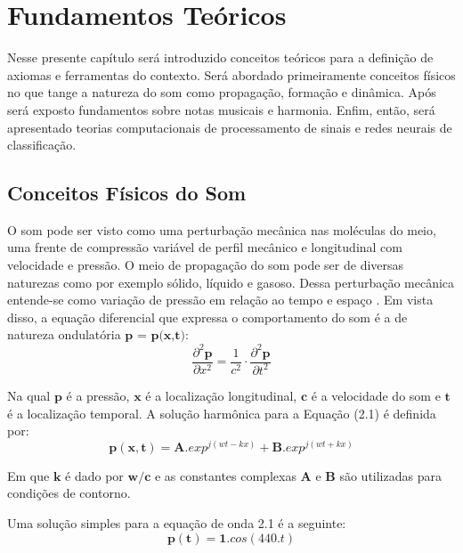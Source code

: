 \chapter{Fundamentos Teóricos}
\label{chap:fundamentosteoricos}

Nesse presente capítulo será introduzido conceitos teóricos para a definição de axiomas e ferramentas do contexto. Será abordado primeiramente conceitos físicos no que tange a natureza do som como propagação, formação e dinâmica. Após será exposto fundamentos sobre notas musicais e harmonia. Enfim, então, será apresentado teorias computacionais de processamento de sinais e redes neurais de classificação.

\section{Conceitos Físicos do Som}
\label{sec:conceitosfiscossom}

O som pode ser visto como uma perturbação mecânica nas moléculas do meio, uma frente de compressão variável  de perfil mecânico e longitudinal com velocidade e pressão. O meio de propagação do som pode ser de diversas naturezas como por exemplo sólido, líquido e gasoso. Dessa perturbação mecânica entende-se como variação de pressão em relação ao tempo e espaço \cite{portela2008caracterizaccao}. Em vista disso, a equação diferencial que expressa o comportamento do som é a de natureza ondulatória $\textbf{p = p(x,t)}$:
\begin{equation}
\label{eqn01}
	\frac{\partial^{2}\mathbf{p}}{\partial x^{2}} = \frac{1}{c^{2}}\cdot \frac{\partial^{2}\mathbf{p}}{\partial t^{2}}
\end{equation} 

Na qual $\textbf{p}$ é a pressão, $\textbf{x}$ é a localização longitudinal, $\textbf{c}$ é a velocidade do som e $\textbf{t}$ é a localização temporal. A solução harmônica para a Equação (2.1) é definida por:  
\begin{equation}
\label{eqn02}
	\mathbf{p(x,t)} = \mathbf{A}.{exp}^{j(wt - kx)} + \mathbf{B}.{exp}^{j(wt + kx)}
\end{equation}

Em que $\textbf{k}$ é dado por $\textbf{w}/\textbf{c}$ e as constantes complexas $\textbf{A}$ e $\textbf{B}$ são utilizadas para condições de contorno.

Uma solução simples para a equação de onda 2.1 é a seguinte:
\begin{equation}
\label{eqn03}
	\mathbf{p(t)} = \mathbf{1}.{cos}(440.t)
\end{equation}

